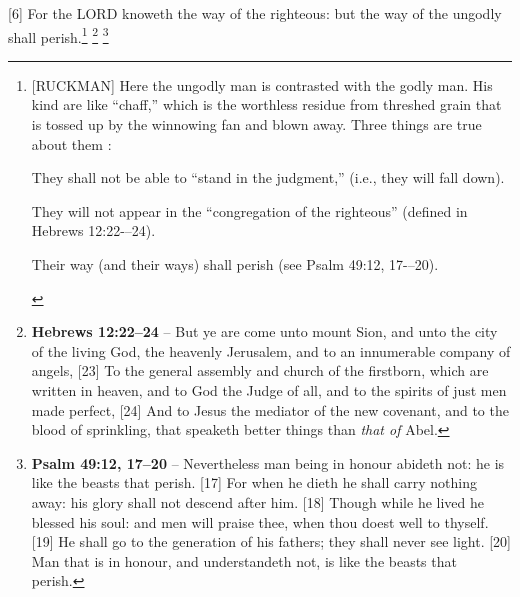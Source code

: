 [6] \textcolor[rgb]{0.00,0.00,1.00}{For the LORD knoweth the way of the righteous: but the way of the ungodly shall perish.}\footnote{[RUCKMAN] Here the ungodly man is contrasted with the godly man. His kind are like “chaff,” which is the worthless residue from threshed grain that is tossed up by the winnowing fan and blown away. Three things are true about them \cite{Ruckman1992Psalms}:\begin{compactenum}
\item They shall not be able to ``stand in the judgment,'' (i.e., they will fall down).
\item They will not appear in the ``congregation of the righteous'' (defined in Hebrews 12:22-–24).
\item Their way (and their ways) shall perish (see Psalm 49:12, 17-–20).
\end{compactenum}} \footnote{\textbf{Hebrews 12:22--24} -- But ye are come unto mount Sion, and unto the city of the living God, the heavenly Jerusalem, and to an innumerable company of angels, [23]  To the general assembly and church of the firstborn, which are written in heaven, and to God the Judge of all, and to the spirits of just men made perfect, [24]  And to Jesus the mediator of the new covenant, and to the blood of sprinkling, that speaketh better things than \emph{that of} Abel.} \footnote{\textbf{Psalm 49:12, 17--20} -- Nevertheless man being in honour abideth not: he is like the beasts that perish. [17]  For when he dieth he shall carry nothing away: his glory shall not descend after him.  [18]  Though while he lived he blessed his soul: and men will praise thee, when thou doest well to thyself. [19]  He shall go to the generation of his fathers; they shall never see light.  [20]  Man that is in honour, and understandeth not, is like the beasts that perish.}

